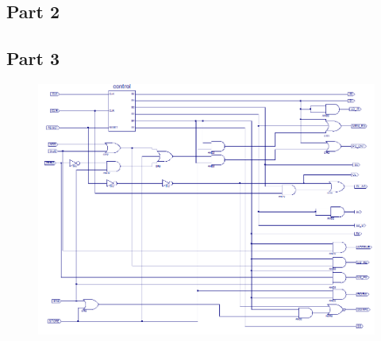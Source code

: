 \documentclass[12pt]{article}
\begin{document}
	\newpage
	\subsection{Part 2}
		
	\subsection{Part 3}
		
		\begin{figure}[h]
			\includegraphics[scale=.6]{controller_sch.png}
		\end{figure}
		
\end{document}
